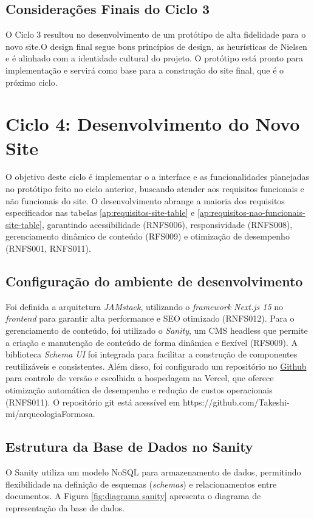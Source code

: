 \subsection*{Considerações Finais do Ciclo 3}
O Ciclo 3 resultou no desenvolvimento de um protótipo de alta fidelidade para o novo site.O design final segue bons princípios de design, as heurísticas de Nielsen e é alinhado com a identidade cultural do projeto. O protótipo está pronto para implementação e servirá como base para a construção do site final, que é o próximo ciclo. 

\section{Ciclo 4: Desenvolvimento do Novo Site}
\label{sec:ciclo4_desenvolvimento}

O objetivo deste ciclo é implementar o a interface e as funcionalidades planejadas no protótipo feito no ciclo anterior, buscando atender aos requisitos funcionais e não funcionais do site. O desenvolvimento abrange a maioria dos requisitos especificados nas tabelas \ref{ap:requisitos-site-table} e \ref{ap:requisitos-nao-funcionais-site-table}, garantindo acessibilidade (RNFS006), responsividade (RNFS008), gerenciamento dinâmico de conteúdo (RFS009) e otimização de desempenho (RNFS001, RNFS011).

    \subsection{Configuração do ambiente de desenvolvimento}
     Foi definida a arquitetura \textit{JAMstack}, utilizando o \textit{framework} \textit{Next.js 15} no \textit{frontend} para garantir alta performance e SEO otimizado (RNFS012). Para o gerenciamento de conteúdo, foi utilizado o \textit{Sanity}, um CMS headless que permite a criação e manutenção de conteúdo de forma dinâmica e flexível (RFS009). A biblioteca \textit{Schema UI} foi integrada para facilitar a construção de componentes reutilizáveis e consistentes. Além disso, foi configurado um repositório no \href{https://github.com/Takeshi-mi/arqueologiaFormosa}{Github} para controle de versão e escolhida a hospedagem na Vercel, que oferece otimização automática de desempenho e redução de custos operacionais (RNFS011). O repositório git está acessível em https://github.com/Takeshi-mi/arqueologiaFormosa.

    
    \subsection{Estrutura da Base de Dados no Sanity}
     O Sanity utiliza um modelo NoSQL para armazenamento de dados, permitindo flexibilidade na definição de esquemas (\textit{schemas}) e relacionamentos entre documentos. A Figura \ref{fig:diagrama sanity} apresenta o diagrama de representação da base de dados.

